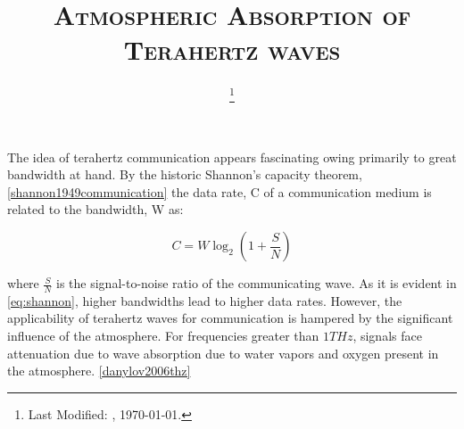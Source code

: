 \documentclass{article}
\begin{document}
  \title{\textsc{Atmospheric Absorption of Terahertz waves}\\}
  \date{\footnote{Last Modified: \currenttime, \today.}}
  \maketitle

  The idea of terahertz communication appears fascinating owing primarily to great bandwidth at hand. By the historic Shannon's capacity theorem, \ref{shannon1949communication} the data rate, C of a communication medium is related to the bandwidth, W as:

  \begin{equation}
    C = W \log_2 \left( 1 + \frac{S}{N} \right )
    \label{eq:shannon}
  \end{equation}

  where $\frac{S}{N}$ is the signal-to-noise ratio of the communicating wave. As it is evident in \ref{eq:shannon}, higher bandwidths lead to higher data rates. However, the applicability of terahertz waves for communication is hampered by the significant influence of the atmosphere. For frequencies greater than $ 1 THz$, signals face attenuation due to wave absorption due to water vapors and oxygen present in the atmosphere. \ref{danylov2006thz}

  
  


  
\end{document}
